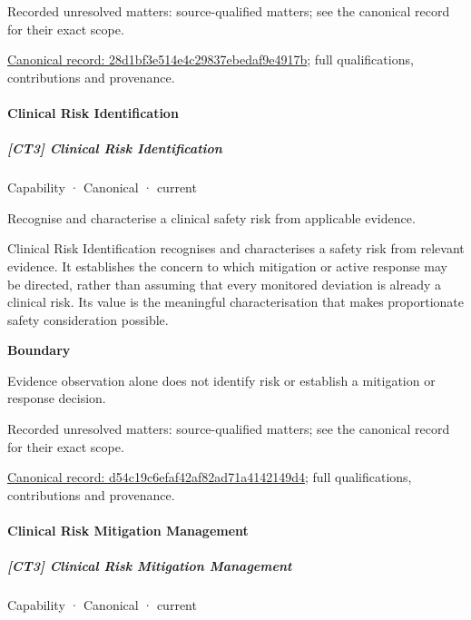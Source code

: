 {\small Recorded unresolved matters: source-qualified matters; see the canonical record for their exact scope.}\par
{\footnotesize \href{../../../../continuum/strategy/capability/28d1bf3e514e4c29837ebedaf9e4917b.md}{Canonical record: 28d1bf3e514e4c29837ebedaf9e4917b}; full qualifications, contributions and provenance.}\par
\paragraph{Clinical Risk Identification}

\subparagraph{[CT3] Clinical Risk Identification}

\label{element:d54c19c6efaf42af82ad71a4142149d4}
{\small Capability · Canonical · current}\par

Recognise and characterise a clinical safety risk from applicable evidence.



Clinical Risk Identification recognises and characterises a safety risk from relevant evidence. It establishes the concern to which mitigation or active response may be directed, rather than assuming that every monitored deviation is already a clinical risk. Its value is the meaningful characterisation that makes proportionate safety consideration possible.



\textbf{Boundary}



Evidence observation alone does not identify risk or establish a mitigation or response decision.


{\small Recorded unresolved matters: source-qualified matters; see the canonical record for their exact scope.}\par
{\footnotesize \href{../../../../continuum/strategy/capability/d54c19c6efaf42af82ad71a4142149d4.md}{Canonical record: d54c19c6efaf42af82ad71a4142149d4}; full qualifications, contributions and provenance.}\par
\paragraph{Clinical Risk Mitigation Management}

\subparagraph{[CT3] Clinical Risk Mitigation Management}

\label{element:2c232ade21ec45619c3ee4e928bd97ee}
{\small Capability · Canonical · current}\par

